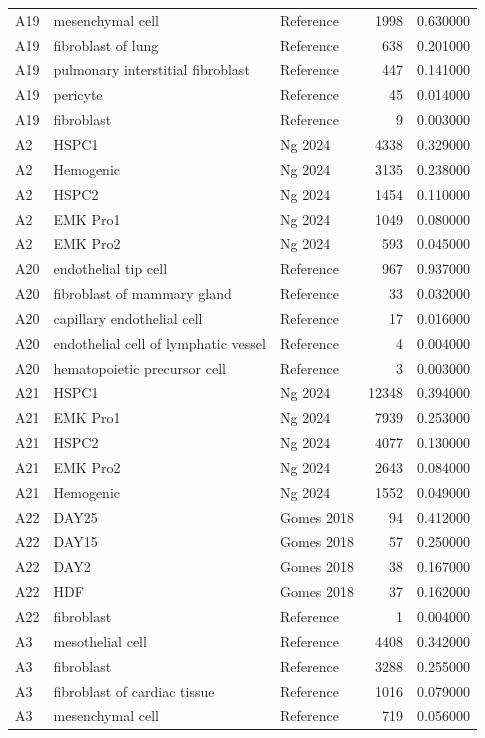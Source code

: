 \begin{longtable}{lllrr}
A19 & mesenchymal cell & Reference & 1998 & 0.630000 \\
A19 & fibroblast of lung & Reference & 638 & 0.201000 \\
A19 & pulmonary interstitial fibroblast & Reference & 447 & 0.141000 \\
A19 & pericyte & Reference & 45 & 0.014000 \\
A19 & fibroblast & Reference & 9 & 0.003000 \\
A2 & HSPC1 & Ng 2024 & 4338 & 0.329000 \\
A2 & Hemogenic & Ng 2024 & 3135 & 0.238000 \\
A2 & HSPC2 & Ng 2024 & 1454 & 0.110000 \\
A2 & EMK Pro1 & Ng 2024 & 1049 & 0.080000 \\
A2 & EMK Pro2 & Ng 2024 & 593 & 0.045000 \\
A20 & endothelial tip cell & Reference & 967 & 0.937000 \\
A20 & fibroblast of mammary gland & Reference & 33 & 0.032000 \\
A20 & capillary endothelial cell & Reference & 17 & 0.016000 \\
A20 & endothelial cell of lymphatic vessel & Reference & 4 & 0.004000 \\
A20 & hematopoietic precursor cell & Reference & 3 & 0.003000 \\
A21 & HSPC1 & Ng 2024 & 12348 & 0.394000 \\
A21 & EMK Pro1 & Ng 2024 & 7939 & 0.253000 \\
A21 & HSPC2 & Ng 2024 & 4077 & 0.130000 \\
A21 & EMK Pro2 & Ng 2024 & 2643 & 0.084000 \\
A21 & Hemogenic & Ng 2024 & 1552 & 0.049000 \\
A22 & DAY25 & Gomes 2018 & 94 & 0.412000 \\
A22 & DAY15 & Gomes 2018 & 57 & 0.250000 \\
A22 & DAY2 & Gomes 2018 & 38 & 0.167000 \\
A22 & HDF & Gomes 2018 & 37 & 0.162000 \\
A22 & fibroblast & Reference & 1 & 0.004000 \\
A3 & mesothelial cell & Reference & 4408 & 0.342000 \\
A3 & fibroblast & Reference & 3288 & 0.255000 \\
A3 & fibroblast of cardiac tissue & Reference & 1016 & 0.079000 \\
A3 & mesenchymal cell & Reference & 719 & 0.056000 \\

\end{longtable}
